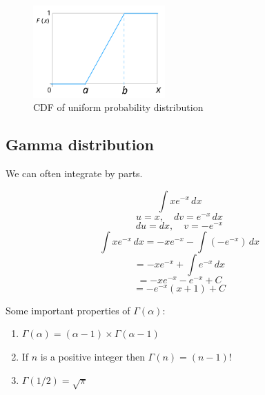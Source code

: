 \begin{figure}[H]
\centering
\includegraphics[width=0.45\textwidth]{images/cont_uniform_dist_cdf.png}
\caption{CDF of uniform probability distribution}
\label{fig:sample}
\end{figure}

\subsection{Gamma distribution}

We can often integrate by parts.

$$
\int x e^{-x} \, dx
$$
$$
u = x, \quad dv = e^{-x} \, dx
$$
$$
du = dx, \quad v = -e^{-x}
$$
$$
\int x e^{-x} \, dx = -x e^{-x} - \int (-e^{-x}) \, dx
$$
$$
= -x e^{-x} + \int e^{-x} \, dx
$$
$$
= -x e^{-x} - e^{-x} + C
$$
$$
= -e^{-x}(x + 1) + C
$$


Some important properties of $\Gamma (\alpha)$:
\begin{enumerate}
    \item $\Gamma(\alpha) = (\alpha - 1) \times \Gamma(\alpha - 1)$
    \item If $n$ is a positive integer then $\Gamma (n) = (n-1)!$
    \item $\Gamma (1/2) = \sqrt{\pi}$
\end{enumerate}



